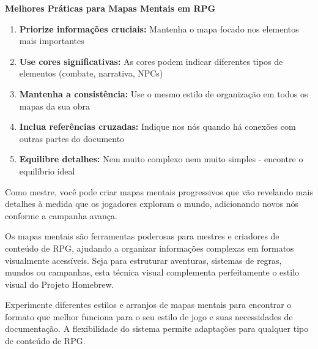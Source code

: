 \documentclass[12pt, a4paper]{book}
\begin{document}
\begin{rule}
\textbf{Melhores Práticas para Mapas Mentais em RPG}

\begin{enumerate}
    \item \textbf{Priorize informações cruciais:} Mantenha o mapa focado nos elementos mais importantes
    \item \textbf{Use cores significativas:} As cores podem indicar diferentes tipos de elementos (combate, narrativa, NPCs)
    \item \textbf{Mantenha a consistência:} Use o mesmo estilo de organização em todos os mapas da sua obra
    \item \textbf{Inclua referências cruzadas:} Indique nos nós quando há conexões com outras partes do documento
    \item \textbf{Equilibre detalhes:} Nem muito complexo nem muito simples - encontre o equilíbrio ideal
\end{enumerate}
\end{rule}


\begin{dmnote}
Como mestre, você pode criar mapas mentais progressivos que vão revelando mais detalhes à medida que os jogadores exploram o mundo, adicionando novos nós conforme a campanha avança.
\end{dmnote}


Os mapas mentais são ferramentas poderosas para mestres e criadores de conteúdo de RPG, ajudando a organizar informações complexas em formatos visualmente acessíveis. Seja para estruturar aventuras, sistemas de regras, mundos ou campanhas, esta técnica visual complementa perfeitamente o estilo visual do Projeto Homebrew.

\begin{highlight}
Experimente diferentes estilos e arranjos de mapas mentais para encontrar o formato que melhor funciona para o seu estilo de jogo e suas necessidades de documentação. A flexibilidade do sistema permite adaptações para qualquer tipo de conteúdo de RPG.
\end{highlight}
\end{document}
